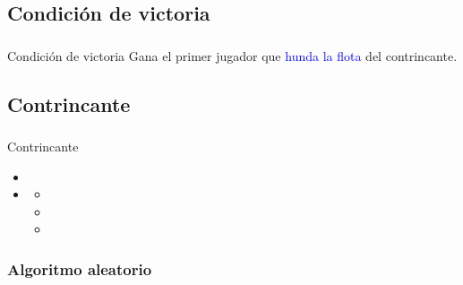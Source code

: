 \subsection{Condición de victoria}

\begin{frame}
    \frametitle{\insertsection}
    \framesubtitle{\hskip30pt \insertsubsection}

    \begin{block}{Condición de victoria}
        Gana el primer jugador que \textcolor{blue}{hunda la flota} del contrincante.
    \end{block}
    
\end{frame}

\subsection{Contrincante}

\begin{frame}
    \frametitle{\insertsection}
    \framesubtitle{\hskip30pt \insertsubsection}

    \begin{block}{Contrincante}
        \begin{itemize}
            \item{}
            \item{}
            \begin{itemize}
                \item{}
                \item{}
                \item{} 
            \end{itemize}
        \end{itemize}
    \end{block}
    
\end{frame}

\subsubsection{Algoritmo aleatorio}

